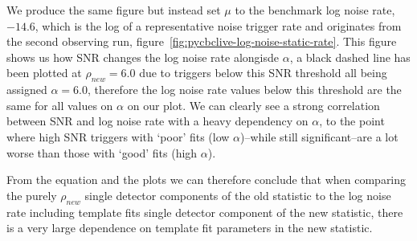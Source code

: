 \begin{figure}
\begin{minipage}[t]{1.0\linewidth}
  \end{minipage}
\end{figure}
%
We produce the same figure but instead set $\mu$ to the benchmark log noise rate, $-14.6$, which is the log of a representative noise trigger rate and originates from the second observing run, figure~\ref{fig:pycbclive-log-noise-static-rate}. This figure shows us how SNR changes the log noise rate alongisde $\alpha$, a black dashed line has been plotted at $\rho_{new} = 6.0$ due to triggers below this SNR threshold all being assigned $\alpha = 6.0$, therefore the log noise rate values below this threshold are the same for all values on $\alpha$ on our plot. We can clearly see a strong correlation between SNR and log noise rate with a heavy dependency on $\alpha$, to the point where high SNR triggers with `poor' fits (low $\alpha$)--while still significant--are a lot worse than those with `good' fits (high $\alpha$).

From the equation and the plots we can therefore conclude that when comparing the purely $\rho_{new}$ single detector components of the old statistic to the log noise rate including template fits single detector component of the new statistic, there is a very large dependence on template fit parameters in the new statistic. 


